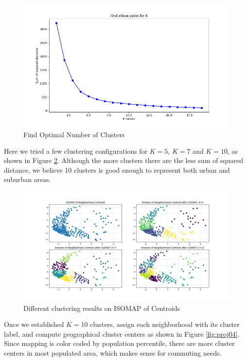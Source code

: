 \documentclass{article}
\begin{document}
\begin{figure}[ht]
\centering
\includegraphics[width=\textwidth]{proj02.png}
\caption{Find Optimal Number of Clusters}
\label{fig:proj02}
\end{figure}

Here we tried a few clustering configurations for $K=5$, $K=7$ and $K=10$, as shown in Figure \ref{fig:proj03}. Although the more clusters there are the less sum of squared distance, we believe 10 clusters is good enough to represent both urban and suburban areas. 

\begin{figure}[ht]
\centering
\includegraphics[width=\textwidth]{proj03.png}
\caption{Different clustering results on ISOMAP of Centroids }
\label{fig:proj03}
\end{figure}

Once we established $K=10$ clusters, assign each neighborhood with its cluster label, and compute geographical cluster centers as shown in Figure \ref{fig:proj04}. Since mapping is color coded by population percentile, there are more cluster centers in most populated area, which makes sense for commuting needs.
\end{document}
